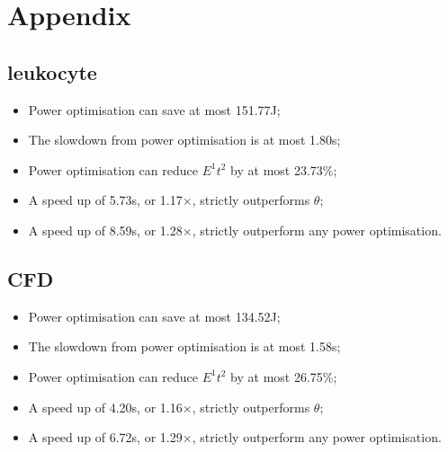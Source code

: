 \section{Appendix} \noindent


\subsection{leukocyte}
\begin{itemize}
  \item Power optimisation can save at most 151.77J;
  \item The slowdown from power optimisation is at most 1.80s;
  \item Power optimisation can reduce $E^1t^2$ by at most 23.73\%;
  \item A speed up of 5.73s, or 1.17$\times$, strictly outperforms $\theta$;
  \item A speed up of 8.59s, or 1.28$\times$, strictly outperform any power optimisation.
\end{itemize}

\subsection{CFD}
\begin{itemize}
  \item Power optimisation can save at most 134.52J;
  \item The slowdown from power optimisation is at most 1.58s;
  \item Power optimisation can reduce $E^1t^2$ by at most 26.75\%;
  \item A speed up of 4.20s, or 1.16$\times$, strictly outperforms $\theta$;
  \item A speed up of 6.72s, or 1.29$\times$, strictly outperform any power optimisation.
\end{itemize}

